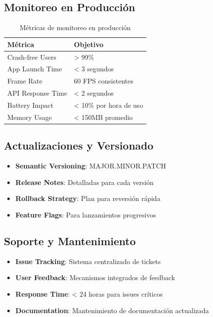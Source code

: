 \documentclass[12pt]{article}
\begin{document}
\subsection{Monitoreo en Producción}
\begin{table}[H]
\centering
\begin{tabularx}{\textwidth}{|l|X|}
\hline
\textbf{Métrica} & \textbf{Objetivo} \\
\hline
Crash-free Users & > 99\% \\
\hline
App Launch Time & < 3 segundos \\
\hline
Frame Rate & 60 FPS consistentes \\
\hline
API Response Time & < 2 segundos \\
\hline
Battery Impact & < 10\% por hora de uso \\
\hline
Memory Usage & < 150MB promedio \\
\hline
\end{tabularx}
\caption{Métricas de monitoreo en producción}
\end{table}

\subsection{Actualizaciones y Versionado}
\begin{itemize}
    \item \textbf{Semantic Versioning}: MAJOR.MINOR.PATCH
    \item \textbf{Release Notes}: Detalladas para cada versión
    \item \textbf{Rollback Strategy}: Plan para reversión rápida
    \item \textbf{Feature Flags}: Para lanzamientos progresivos
\end{itemize}

\subsection{Soporte y Mantenimiento}
\begin{itemize}
    \item \textbf{Issue Tracking}: Sistema centralizado de tickets
    \item \textbf{User Feedback}: Mecanismos integrados de feedback
    \item \textbf{Response Time}: < 24 horas para issues críticos
    \item \textbf{Documentation}: Mantenimiento de documentación actualizada
\end{itemize}
\end{document}
